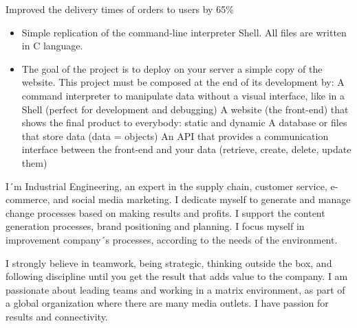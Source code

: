 \documentclass[paper=a4,fontsize=10pt,ragged2e,withhyper]{altacv}%
\begin{document}
\begin{paracol}{2}
\begin{itemize}
Improved the delivery times of orders to users by 65\% 
\end{itemize}
\divider
{}
\divider
{}
\divider
{}
\divider
{}
\divider
{}
\divider
{}
\divider
{}
\divider
{}%
\begin{itemize}
 \item Simple replication of the command{-}line interpreter Shell. All files are written in C language.
\end{itemize}
\divider
{}
\begin{itemize}
 \item The goal of the project is to deploy on your server a simple copy of the website. This project must be composed at the end of its development by:\newline%
A command interpreter to manipulate data without a visual interface, like in a Shell (perfect for development and debugging)\newline%
A website (the front{-}end) that shows the final product to everybody: static and dynamic\newline%
A database or files that store data (data = objects)\newline%
An API that provides a communication interface between the front{-}end and your data (retrieve, create, delete, update them)
\end{itemize}%

\switchcolumn%

I´m Industrial Engineering, an expert in the supply chain, customer service, e-commerce, and social media marketing. I dedicate myself to generate and manage change processes based on making results and profits. I support the content generation processes, brand positioning and planning. I focus myself in improvement company´s processes, according to the needs of the environment.

I strongly believe in teamwork, being strategic, thinking outside the box, and following discipline until you get the result that adds value to the company. I am passionate about leading teams and working in a matrix environment, as part of a global organization where there are many media outlets. I have passion for results and connectivity.


\end{paracol}
\end{document}
